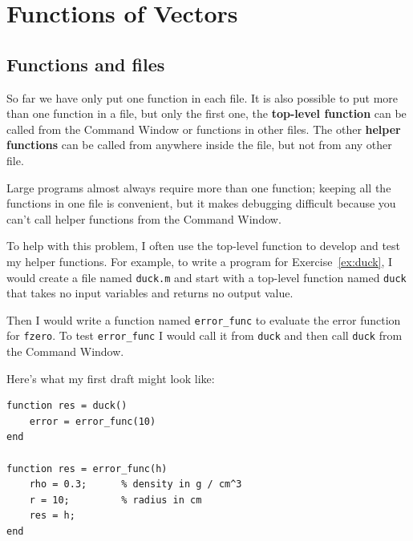 \documentclass[
]{book}
\begin{document}










\chapter{Functions of Vectors}


\section{Functions and files}
\label{sect:funfiles}

So far we have only put one function in each file.  It is also possible
to put more than one function in a file, but only the first one, the
{\bf top-level function} can be called from the Command
Window or functions in other files. The other {\bf helper
functions} can be called from anywhere inside the file, but not from any
other file.

Large programs almost always require more than one function; keeping
all the functions in one file is convenient, but it makes debugging
difficult because you can't call helper functions from the Command
Window.

To help with this problem, I often use the top-level function
to develop and test my helper functions.  For example, to write
a program for Exercise~\ref{ex:duck}, I would create a file named
{\tt duck.m} and start with a top-level function named {\tt duck}
that takes no input variables and returns no output value.

Then I would write a function named {\tt error\_func} to
evaluate the error function for {\tt fzero}.  To test
{\tt error\_func} I would call it from {\tt duck} and then
call {\tt duck} from the Command Window.

Here's what my first draft might look like:

\begin{verbatim}
function res = duck()
    error = error_func(10)
end

function res = error_func(h)
    rho = 0.3;      % density in g / cm^3
    r = 10;         % radius in cm
    res = h;
end
\end{verbatim}
\end{document}
